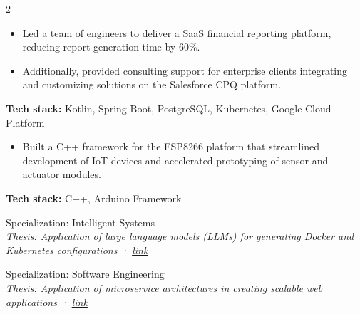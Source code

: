 \documentclass[10pt,a4paper,ragged2e,withhyper]{altacv}
\begin{document}
\newpage

\begin{paracol}{2}



\begin{itemize}
  \item Led a team of engineers to deliver a SaaS financial reporting platform, reducing report generation time by 60\%.
  \item Additionally, provided consulting support for enterprise clients integrating and customizing solutions on the Salesforce CPQ platform.
\end{itemize}
\textbf{Tech stack:} Kotlin, Spring Boot, PostgreSQL, Kubernetes, Google Cloud Platform

\divider

\begin{itemize}
  \item Built a C++ framework for the ESP8266 platform that streamlined development of IoT devices and accelerated prototyping of sensor and actuator modules.
\end{itemize}
\textbf{Tech stack:} C++, Arduino Framework

\divider


Specialization: Intelligent Systems\\
\small\textit{Thesis: Application of large language models (LLMs) for generating Docker and Kubernetes configurations · \href{https://github.com/BartlomiejRasztabiga/masters-thesis}{link}}

\divider

Specialization: Software Engineering\\
\small\textit{Thesis: Application of microservice architectures in creating scalable web applications · \href{https://github.com/BartlomiejRasztabiga/bachelors-thesis}{link}}



\end{paracol}
\end{document}
